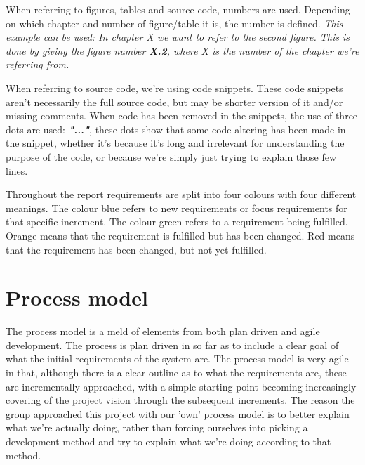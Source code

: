 When referring to figures, tables and source code, numbers are used. Depending on which chapter and number of figure/table it is, the number is defined. \newline
\textit{This example can be used: In chapter X we want to refer to the second figure. This is done by giving the figure number \textbf{X.2}, where X is the number of the chapter we're referring from.}
\newline

When referring to source code, we're using code snippets. These code snippets aren't necessarily the full source code, but may be shorter version of it and/or missing comments. When code has been removed in the snippets, the use of three dots are used:  \textit\textbf{{"..."}}, these dots show that some code altering has been made in the snippet, whether it's because it's long and irrelevant for understanding the purpose of the code, or because we're simply just trying to explain those few lines. 

Throughout the report requirements are split into four colours with four different meanings. The colour blue refers to new requirements or focus requirements for that specific increment. The colour green refers to a requirement being fulfilled. Orange means that the requirement is fulfilled but has been changed. Red means that the requirement has been changed, but not yet fulfilled. 


\chapter*{Process model}
The process model is a meld of elements from both plan driven and agile development. The process is plan driven in so far as to include a clear goal of what the initial requirements of the system are. The process model is very agile in that, although there is a clear outline as to what the requirements are, these are incrementally approached, with a simple starting point becoming increasingly covering of the project vision through the subsequent increments. The reason the group approached this project with our 'own' process model is to better explain what we're actually doing, rather than forcing ourselves into picking a development method and try to explain what we're doing according to that method.

